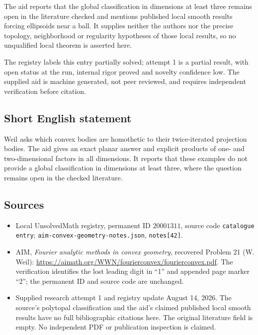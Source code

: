 \documentclass[11pt]{article}
\begin{document}
The aid reports that the global classification in dimensions at least three remains open in the literature checked and mentions published local smooth results forcing ellipsoids near a ball. It supplies neither the authors nor the precise topology, neighborhood or regularity hypotheses of those local results, so no unqualified local theorem is asserted here.

The registry labels this entry partially solved; attempt 1 is a partial result, with open status at the run, internal rigor proved and novelty confidence low. The supplied aid is machine generated, not peer reviewed, and requires independent verification before citation.
\subsection{Short English statement}
Weil asks which convex bodies are homothetic to their twice-iterated projection bodies. The aid gives an exact planar answer and explicit products of one- and two-dimensional factors in all dimensions. It reports that these examples do not provide a global classification in dimensions at least three, where the question remains open in the checked literature.
\subsection{Sources}
\begin{itemize}
\item Local UnsolvedMath registry, permanent ID \(20001311\), source code \texttt{catalogue entry}; \texttt{aim-convex-geometry-notes.json}, \texttt{notes[42]}.
\item AIM, \emph{Fourier analytic methods in convex geometry}, recovered Problem 21 (W. Weil): \url{https://aimath.org/WWN/fourierconvex/fourierconvex.pdf}. The verification identifies the lost leading digit in ``1'' and appended page marker ``2''; the permanent ID and source code are unchanged.
\item Supplied research attempt 1 and registry update August 14, 2026. The source's polytopal classification and the aid's claimed published local smooth results have no full bibliographic citations here. The original literature field is empty. No independent PDF or publication inspection is claimed.
\end{itemize}
\end{document}
